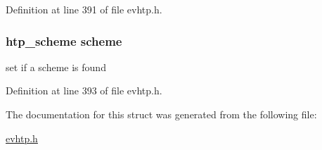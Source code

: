 Definition at line 391 of file evhtp.\-h.

\hypertarget{structevhtp__uri__s_ad585f48c56bdcc852338aa35466e3f8d}{
\subsubsection[{scheme}]{\setlength{\rightskip}{0pt plus 5cm}htp\-\_\-scheme scheme}}\label{structevhtp__uri__s_ad585f48c56bdcc852338aa35466e3f8d}
set if a scheme is found 

Definition at line 393 of file evhtp.\-h.



The documentation for this struct was generated from the following file\-:\begin{DoxyCompactItemize}
\item 
\hyperlink{evhtp_8h}{evhtp.\-h}\end{DoxyCompactItemize}
